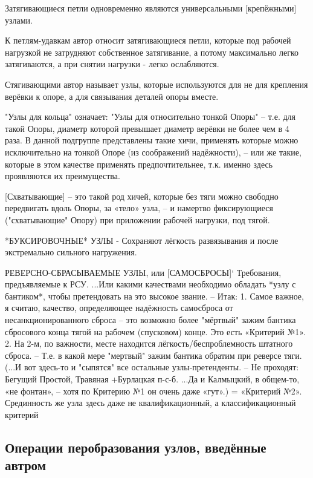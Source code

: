 Затягивающиеся петли одновременно являются универсальными [крепёжными] узлами.

К петлям-удавкам автор относит затягивающиеся петли, которые под рабочей нагрузкой не затрудняют собственное затягивание, а потому максимально легко затягиваются, а при снятии нагрузки - легко ослабляются.

Стягивающими автор называет узлы, которые используются для не для крепления верёвки к опоре, а для связывания деталей опоры вместе.

"Узлы для кольца"  означает:  "Узлы для относительно тонкой Опоры"  –  т.е. для такой Опоры, диаметр которой превышает диаметр верёвки не более чем в 4 раза. В  данной  подгруппе представлены такие хичи, применять которые можно исключительно на тонкой Опоре  (из соображений надёжности), – или же такие, которые  в этом качестве применять предпочтительнее, т.к. именно здесь проявляются их преимущества.

[Схватывающие] – это такой род  хичей, которые без тяги можно свободно передвигать вдоль Опоры, за «тело» узла, – и намертво фиксирующиеся  ("схватывающие" Опору)  при приложении рабочей нагрузки, под тягой.  

*БУКСИРОВОЧНЫЕ* УЗЛЫ - Сохраняют лёгкость развязывания и после экстремально сильного нагружения.

РЕВЕРСНО-СБРАСЫВАЕМЫЕ УЗЛЫ, или [САМОСБРОСЫ]`
Требования, предъявляемые к РСУ.  ...Или  какими  качествами  необходимо обладать *узлу с бантиком*, чтобы претендовать на это высокое звание. – Итак:
1. Самое  важное, я считаю, качество, определяющее надёжность самосброса от несанкционированного сброса – это возможно более "мёртвый" зажим бантика сбросового конца тягой на рабочем (спусковом) конце. Это есть «Критерий №1».
2. На 2-м, по важности, месте находится лёгкость/беспроблемность штатного сброса. – Т.е. в какой мере "мертвый" зажим бантика обратим при реверсе тяги. (...И вот здесь-то и "сыпятся" все остальные узлы-претенденты. – Не проходят: Бегущий Простой, Травяная +Бурлацкая  п-с-б. ...Да и Калмыцкий, в общем-то, «не фонтан», – хотя по Критерию №1 он очень даже «гут».)  = «Критерий №2».
Срединность же узла здесь даже не квалификационный, а классификационный критерий


\subsection{Операции перобразования узлов, введённые автром}

